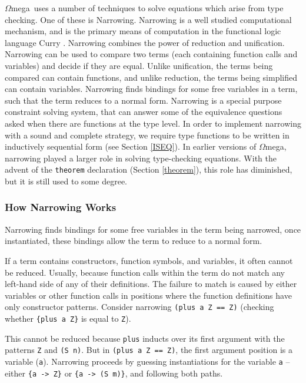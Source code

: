\documentclass[11pt,twoside]{article}
\newcommand{\om}{$\Omega$mega}
\begin{document}
\om\ uses a number of techniques to solve equations which arise from
type checking. One of these is Narrowing.
Narrowing is a well studied computational mechanism, and is the primary means of
computation in the functional logic language Curry
\cite{Hanus06Curry,journals/jflp/HanusS99}. Narrowing combines the power of reduction
and unification. Narrowing can be used to compare
two terms (each containing function calls and variables)
and decide if they are equal. Unlike unification, the terms being compared can contain functions,
and unlike reduction, the terms being simplified can contain variables. Narrowing
finds bindings for some free variables in a term, such that the term reduces to a
normal form. Narrowing is a special purpose constraint solving system, 
that can answer some of the equivalence questions asked when there are functions at the type
level. In order to implement narrowing with a sound and complete strategy, we require
type functions to be written in inductively sequential form (see Section \ref{ISEQ}).
In earlier versions of \om, narrowing played a larger role
in solving type-checking equations. With the advent of the
{\tt theorem} declaration (Section \ref{theorem}), this role has
diminished, but it is still used to some degree.


\subsubsection{How Narrowing Works}

Narrowing finds bindings for some
free variables in the term being narrowed, once
instantiated, these bindings allow the term to reduce to a
normal form.

If a term contains constructors, function symbols, and
variables, it often cannot be reduced. Usually, because
function calls within the term do not match any left-hand
side of any of their definitions. The failure to match is
caused by either variables or other function calls in
positions where the function definitions have only
constructor patterns. Consider narrowing {\tt ({plus a Z} ==
Z)} (checking whether \verb+{plus a Z}+ is equal to \verb+Z+). 

This cannot be reduced because {\tt plus} inducts over
its first argument with the patterns {\tt Z} and {\tt (S n)}.
But in {\tt ({plus a Z} == Z)}, the first argument position
is a variable ({\tt a}).  Narrowing proceeds by
guessing instantiations for the variable {\tt a} -- 
either \verb+{a -> Z}+ or \verb+{a -> (S m)}+,
and following both paths.
\end{document}
